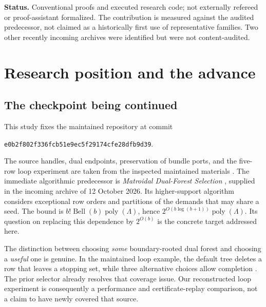 \documentclass[11pt,letterpaper]{article}
\theoremstyle{definition}
\newcommand{\poly}{\operatorname{poly}}
\newcommand{\Bell}{\operatorname{Bell}}
\newcommand{\pin}{\texttt{e0b2f802f336fcb51e9ec5f29174cfe28dfb9d39}}
\begin{document}
\begin{titlepage}
\begin{abstract}
The package contains 71 passing unit tests, 8,061 exhaustive/random
matrix--graph comparisons, 300 planted positive trials, independent
finite-field audits, comparative timings, and an opt-in record-level native
adapter. All 3,417 positive trials were certified; 3,391 negative inputs
had exact local certificates and 1,553 remained explicitly inconclusive.
These results improve a specified local selection stage. They do not establish
a general quasi-polynomial unknot recognizer or a geometric realization theorem
for the abstract benchmark families.
\end{abstract}
\vfill
{\small\textbf{Status.} Conventional proofs and executed research code; not
externally refereed or proof-assistant formalized. The contribution is measured
against the audited predecessor, not claimed as a historically first use of
representative families. Two other recently incoming archives were identified
but were not content-audited.}\par
\end{titlepage}
\hypersetup{pageanchor=true}
\tableofcontents
\clearpage{}

\section{Research position and the advance}
\subsection{The checkpoint being continued}
This study fixes the maintained repository at commit
\begin{center}\small\pin.\end{center}
The source handles, dual endpoints, preservation of bundle ports, and the
five-row loop experiment are taken from the inspected maintained materials
\cite{repo,dual,loop,kernel}. The immediate algorithmic predecessor is
\emph{Matroidal Dual-Forest Selection} \cite{prior}, supplied in the incoming
archive of 12 October 2026. Its higher-support algorithm considers exceptional
row orders and partitions of the demands that may share a seed. The bound is
$b!\Bell(b)\poly(\Lambda)$, hence $2^{O(b\log(b+1))}\poly(\Lambda)$.
Its question on replacing this dependence by $2^{O(b)}$ is the concrete target
addressed here.

The distinction between choosing \emph{some} boundary-rooted dual forest and
choosing a \emph{useful} one is genuine. In the maintained loop example, the
default tree deletes a row that leaves a stopping set, while three alternative
choices allow completion \cite{loop}. The prior selector already resolves
that coverage issue. Our reconstructed loop experiment is consequently a
performance and certificate-replay comparison, not a claim to have newly
covered that source.
\end{document}
